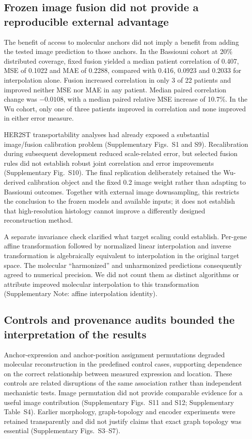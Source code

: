 
\FloatBarrier

\subsection{Frozen image fusion did not provide a reproducible external advantage}
The benefit of access to molecular anchors did not imply a benefit from adding the tested image prediction to those anchors. In the Bassiouni cohort at 20\% distributed coverage, fixed fusion yielded a median patient correlation of 0.407, MSE of 0.1022 and MAE of 0.2288, compared with 0.416, 0.0923 and 0.2033 for interpolation alone. Fusion increased correlation in only 3 of 22 patients and improved neither MSE nor MAE in any patient. Median paired correlation change was $-0.0108$, with a median paired relative MSE increase of 10.7\%. In the Wu cohort, only one of three patients improved in correlation and none improved in either error measure.

HER2ST transportability analyses had already exposed a substantial image/fusion calibration problem (Supplementary Figs.~S1 and S9). Recalibration during subsequent development reduced scale-related error, but selected fusion rules did not establish robust joint correlation and error improvements (Supplementary Fig.~S10). The final replication deliberately retained the Wu-derived calibration object and the fixed 0.2 image weight rather than adapting to Bassiouni outcomes. Together with external image downsampling, this restricts the conclusion to the frozen models and available inputs; it does not establish that high-resolution histology cannot improve a differently designed reconstruction method.

A separate invariance check clarified what target scaling could establish. Per-gene affine transformation followed by normalized linear interpolation and inverse transformation is algebraically equivalent to interpolation in the original target space. The molecular ``harmonized'' and unharmonized predictions consequently agreed to numerical precision. We did not count them as distinct algorithms or attribute improved molecular interpolation to this transformation (Supplementary Note: affine interpolation identity).

\subsection{Controls and provenance audits bounded the interpretation of the results}
Anchor-expression and anchor-position assignment permutations degraded molecular reconstruction in the predefined control cases, supporting dependence on the correct relationship between measured expression and location. These controls are related disruptions of the same association rather than independent mechanistic tests. Image permutation did not provide comparable evidence for a useful image contribution (Supplementary Figs.~S11 and S12; Supplementary Table~S4). Earlier morphology, graph-topology and encoder experiments were retained transparently and did not justify claims that exact graph topology was essential (Supplementary Figs.~S3--S7).

